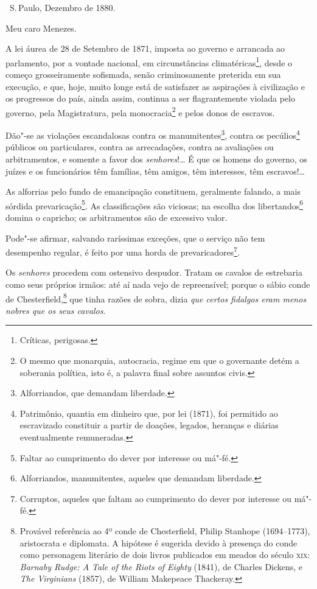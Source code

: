 \hfill\ S.\,Paulo, Dezembro de 1880.\bigskip

\noindent{}Meu caro Menezes.\smallskip

A lei áurea de 28 de Setembro de 1871, imposta ao governo e arrancada ao
parlamento, por a vontade nacional, em circunstâncias
climatéricas\footnote{Críticas, perigosas.}, desde o começo
grosseiramente sofismada, senão criminosamente preterida em sua
execução, e que, hoje, muito longe está de satisfazer as aspirações à
civilização e os progressos do país, ainda assim, continua a ser
flagrantemente violada pelo governo, pela Magistratura, pela
monocracia\footnote{O mesmo que monarquia, autocracia, regime em que o
  governante detém a soberania política, isto é, a palavra final sobre
  assuntos civis.} e pelos donos de escravos.

Dão"-se as violações escandalosas contra os manumitentes\footnote{
  Alforriandos, que demandam liberdade.}, contra os pecúlios\footnote{
  Patrimônio, quantia em dinheiro que, por lei (1871), foi permitido ao
  escravizado constituir a partir de doações, legados, heranças e
  diárias eventualmente remuneradas.} públicos ou particulares, contra
as arrecadações, contra as avaliações ou arbitramentos, e somente a
favor dos \emph{senhores}!\ldots{} É que os homens do governo, os juízes e os
funcionários têm famílias, têm amigos, têm interesses, têm escravos!\ldots{}

As alforrias pelo fundo de emancipação constituem, geralmente falando, a mais sórdida
prevaricação\footnote{
  Faltar ao cumprimento do dever por interesse ou má"-fé.}. As
classificações são viciosas; na escolha dos libertandos\footnote{
  Alforriandos, manumitentes, aqueles que demandam liberdade.} domina o
capricho; os arbitramentos são de excessivo valor.

Pode"-se afirmar, salvando raríssimas exceções, que o serviço não tem
desempenho regular, é feito por uma horda de prevaricadores\footnote{
  Corruptos, aqueles que
  faltam ao cumprimento do dever por interesse ou má"-fé.}.

Os \emph{senhores} procedem com ostensivo despudor. Tratam os cavalos de
estrebaria como seus próprios irmãos: até aí nada vejo de repreensível;
porque o sábio conde de Chesterfield,\footnote{Provável referência ao
 4º conde de Chesterfield, Philip Stanhope (1694--1773), aristocrata e
 diplomata. A hipótese é sugerida devido à presença do conde como
  personagem literário de dois livros publicados em meados do século
  \textsc{xix}: \emph{Barnaby Rudge: A Tale of the Riots of Eighty} (1841), de
  Charles Dickens, e \emph{The Virginians} (1857), de William Makepeace
  Thackeray.} que tinha razões de sobra, dizia \emph{que certos fidalgos
eram menos nobres que os seus cavalos}.

